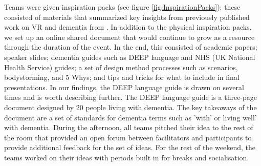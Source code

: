 Teams were given inspiration packs (see figure \ref{fig:InspirationPacks}): these consisted of materials that summarized key insights from previously published work on VR and dementia from \citep{hodge_exploring_2018}. In addition to the physical inspiration packs, we set up an online shared document that would continue to grow as a resource through the duration of the event. In the end, this consisted of academic papers; speaker slides; dementia guides such as DEEP language and NHS (UK National Health Service) guides; a set of design method processes such as scenarios, bodystorming, and 5 Whys; and tips and tricks for what to include in final presentations. In our findings, the DEEP language guide is drawn on several times and is worth describing further. The DEEP language guide is a three-page document designed by 20 people living with dementia. The key takeaways of the document are a set of standards for dementia terms such as 'with' or living well' with dementia. During the afternoon, all teams pitched their idea to the rest of the room that provided an open forum between facilitators and participants to provide additional feedback for the set of ideas. For the rest of the weekend, the teams worked on their ideas with periods built in for breaks and socialisation. 


